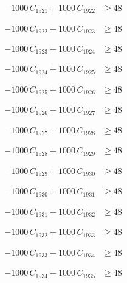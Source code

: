 \documentclass[a4paper,11pt]{article}
\begin{document}
\begin{align}
-1000\,C_{1921} + 1000\,C_{1922} &\geq 48 \nonumber
\end{align}

\begin{align}
-1000\,C_{1922} + 1000\,C_{1923} &\geq 48 \nonumber
\end{align}

\begin{align}
-1000\,C_{1923} + 1000\,C_{1924} &\geq 48 \nonumber
\end{align}

\begin{align}
-1000\,C_{1924} + 1000\,C_{1925} &\geq 48 \nonumber
\end{align}

\begin{align}
-1000\,C_{1925} + 1000\,C_{1926} &\geq 48 \nonumber
\end{align}

\begin{align}
-1000\,C_{1926} + 1000\,C_{1927} &\geq 48 \nonumber
\end{align}

\begin{align}
-1000\,C_{1927} + 1000\,C_{1928} &\geq 48 \nonumber
\end{align}

\begin{align}
-1000\,C_{1928} + 1000\,C_{1929} &\geq 48 \nonumber
\end{align}

\begin{align}
-1000\,C_{1929} + 1000\,C_{1930} &\geq 48 \nonumber
\end{align}

\begin{align}
-1000\,C_{1930} + 1000\,C_{1931} &\geq 48 \nonumber
\end{align}

\begin{align}
-1000\,C_{1931} + 1000\,C_{1932} &\geq 48 \nonumber
\end{align}

\begin{align}
-1000\,C_{1932} + 1000\,C_{1933} &\geq 48 \nonumber
\end{align}

\begin{align}
-1000\,C_{1933} + 1000\,C_{1934} &\geq 48 \nonumber
\end{align}

\begin{align}
-1000\,C_{1934} + 1000\,C_{1935} &\geq 48 \nonumber
\end{align}
\end{document}
